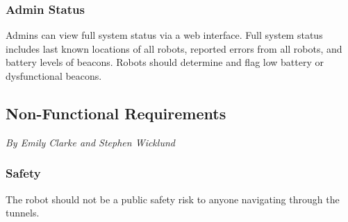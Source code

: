 \documentclass[12pt]{report}
\newcommand{\sectionAuthor}[1]{{\small\vspace{-1em}\textit{#1}}\bigskip\par}
\begin{document}
\subsubsection{Admin Status}
Admins can view full system status via a web interface. Full system status includes last known locations of all robots, reported errors from all robots, and battery levels of beacons. Robots should determine and flag low battery or dysfunctional beacons.
\subsection{Non-Functional Requirements}
\sectionAuthor{By Emily Clarke and Stephen Wicklund}


\subsubsection{Safety}
The robot should not be a public safety risk to anyone navigating through the tunnels.
\end{document}
